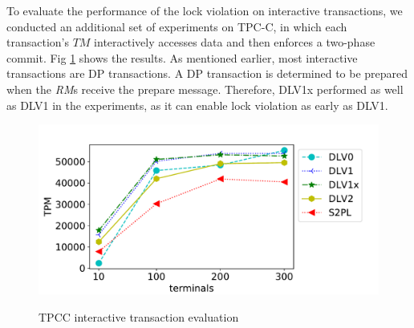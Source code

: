 \documentclass[conference]{IEEEtran}
\begin{document}
\begin{highlighted}

To evaluate the performance of the lock violation on interactive transactions,
we conducted an additional set of experiments on TPC-C, in which each transaction's ${TM}$ interactively accesses data and then enforces a two-phase commit.
Fig \ref{fig:interactive_evaluation} shows the results.
As mentioned earlier, most interactive transactions are DP transactions.
A DP transaction is determined to be prepared when the \emph{RM}s receive the prepare message.
Therefore, DLV1x performed as well as DLV1 in the experiments, as it can enable lock violation as early as DLV1.
\end{highlighted}

\begin{figure}[tbp]
  \centering

      { \includegraphics[scale=0.35] {figure/plot_interactive__tpcc_neworder_add_Terminal_Terminal_TPM_gather} \label{fig:tpcc_add_terminal_interactive:tpm}}

      \caption{TPCC interactive transaction evaluation}
      \label{fig:interactive_evaluation}
      \end{figure}
\end{document}
